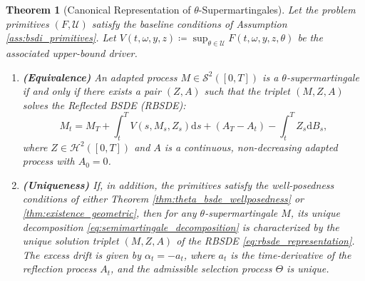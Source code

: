 \documentclass[12pt, letterpaper]{amsart}
\newcommand{\Ucal}{\mathcal{U}}
\newcommand{\Scalp}[1]{\mathcal{S}^{#1}}
\newcommand{\Hcalp}[1]{\mathcal{H}^{#1}}
\newcommand{\dd}{\mathrm{d}}
\theoremstyle{plain}
\newtheorem{theorem}{Theorem}[section]
\theoremstyle{definition}
\theoremstyle{remark}
\numberwithin{equation}{section} %
\begin{document}
\begin{theorem}[Canonical Representation of \(\theta\)-Supermartingales]
\label{thm:canonical_decomposition}
Let the problem primitives \((F, \Ucal)\) satisfy the baseline conditions of Assumption \ref{ass:bsdi_primitives}. Let \(V(t,\omega,y,z) \coloneqq \sup_{\theta \in \Ucal} F(t,\omega,y,z,\theta)\) be the associated upper-bound driver.
\begin{enumerate}[label=(\roman*)]
    \item \textbf{(Equivalence)} An adapted process \(M \in \Scalp{2}([0,T])\) is a \(\theta\)-supermartingale if and only if there exists a pair \((Z, A)\) such that the triplet \((M, Z, A)\) solves the Reflected BSDE (RBSDE):
    \begin{equation}\label{eq:rbsde_representation}
        M_t = M_T + \int_t^T V(s, M_s, Z_s) \dd s + (A_T - A_t) - \int_t^T Z_s \dd B_s,
    \end{equation}
    where \(Z \in \Hcalp{2}([0,T])\) and \(A\) is a continuous, non-decreasing adapted process with \(A_0=0\).

    \item \textbf{(Uniqueness)} If, in addition, the primitives satisfy the well-posedness conditions of either Theorem \ref{thm:theta_bsde_wellposedness} or \ref{thm:existence_geometric}, then for any \(\theta\)-supermartingale \(M\), its unique decomposition \eqref{eq:semimartingale_decomposition} is characterized by the unique solution triplet \((M, Z, A)\) of the RBSDE \eqref{eq:rbsde_representation}. The excess drift is given by \(\alpha_t = -a_t\), where \(a_t\) is the time-derivative of the reflection process \(A_t\), and the admissible selection process \(\Theta\) is unique.
\end{enumerate}
\end{theorem}
\end{document}
